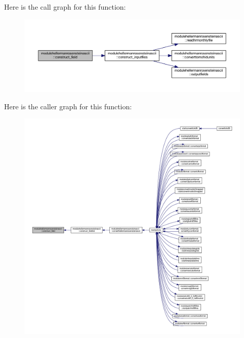 Here is the call graph for this function\+:\nopagebreak
\begin{figure}[H]
\begin{center}
\leavevmode
\includegraphics[width=350pt]{namespacemodulehellermanrosensteinascii_af3153ec18443db4efe86a28f2c87ad90_cgraph}
\end{center}
\end{figure}
Here is the caller graph for this function\+:\nopagebreak
\begin{figure}[H]
\begin{center}
\leavevmode
\includegraphics[width=350pt]{namespacemodulehellermanrosensteinascii_af3153ec18443db4efe86a28f2c87ad90_icgraph}
\end{center}
\end{figure}
\mbox{\label{namespacemodulehellermanrosensteinascii_aabd09e7a0437013b82c90ca944358684}} 
